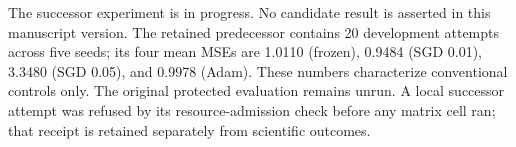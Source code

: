 The successor experiment is in progress. No candidate result is asserted in this manuscript version. The retained predecessor contains 20 development attempts across five seeds; its four mean MSEs are 1.0110 (frozen), 0.9484 (SGD 0.01), 3.3480 (SGD 0.05), and 0.9978 (Adam). These numbers characterize conventional controls only. The original protected evaluation remains unrun. A local successor attempt was refused by its resource-admission check before any matrix cell ran; that receipt is retained separately from scientific outcomes.